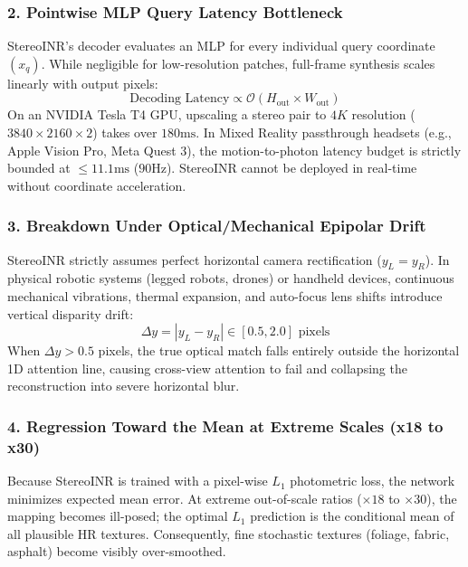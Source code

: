 \documentclass[10pt,journal,compsoc]{IEEEtran}
\begin{document}
\subsubsection{2. Pointwise MLP Query Latency Bottleneck}
StereoINR's decoder evaluates an MLP for every individual query coordinate $(x_q)$. While negligible for low-resolution patches, full-frame synthesis scales linearly with output pixels:
\begin{equation}
\text{Decoding Latency} \propto \mathcal{O}(H_{\text{out}} \times W_{\text{out}})
\end{equation}
On an NVIDIA Tesla T4 GPU, upscaling a stereo pair to $4K$ resolution ($3840 \times 2160 \times 2$) takes over $180\text{ms}$. In Mixed Reality passthrough headsets (e.g., Apple Vision Pro, Meta Quest 3), the motion-to-photon latency budget is strictly bounded at $\le 11.1\text{ms}$ ($90\text{Hz}$). StereoINR cannot be deployed in real-time without coordinate acceleration.

\subsubsection{3. Breakdown Under Optical/Mechanical Epipolar Drift}
StereoINR strictly assumes perfect horizontal camera rectification ($y_L = y_R$). In physical robotic systems (legged robots, drones) or handheld devices, continuous mechanical vibrations, thermal expansion, and auto-focus lens shifts introduce vertical disparity drift:
\begin{equation}
\Delta y = |y_L - y_R| \in [0.5, 2.0]\text{ pixels}
\end{equation}
When $\Delta y > 0.5$ pixels, the true optical match falls entirely outside the horizontal 1D attention line, causing cross-view attention to fail and collapsing the reconstruction into severe horizontal blur.

\subsubsection{4. Regression Toward the Mean at Extreme Scales (x18 to x30)}
Because StereoINR is trained with a pixel-wise $L_1$ photometric loss, the network minimizes expected mean error. At extreme out-of-scale ratios ($\times 18$ to $\times 30$), the mapping becomes ill-posed; the optimal $L_1$ prediction is the conditional mean of all plausible HR textures. Consequently, fine stochastic textures (foliage, fabric, asphalt) become visibly over-smoothed.

\end{document}
